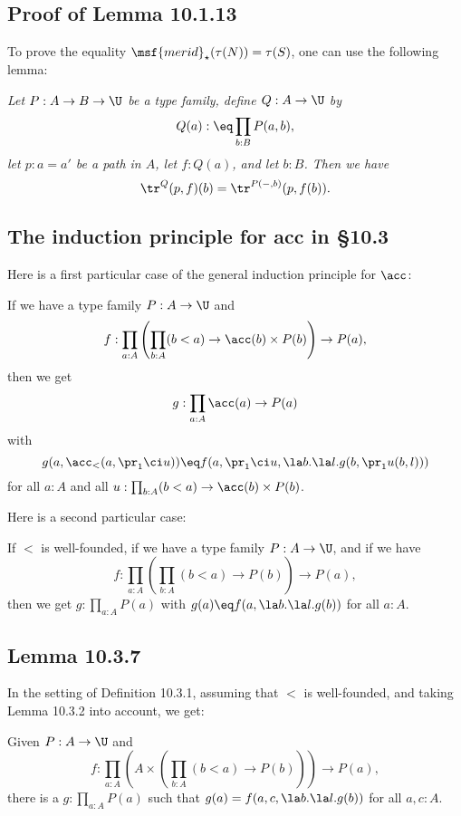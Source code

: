\documentclass[12pt]{article}
\begin{document}

\subsection{Proof of Lemma 10.1.13}

To prove the equality $\msf{merid}_\star(\tau(N))=\tau(S)$, one can use the following lemma:

\emph{Let $P:A\to B\to\U$ be a type family, define $Q:A\to\U$ by $$Q(a):\eq\prod_{b:B}P(a,b),$$ let $p:a=a'$ be a path in $A$, let $f:Q(a)$, and let $b:B$. Then we have} 
$$
\tr^Q(p,f)(b)=\tr^{P(-,b)}(p,f(b)).
$$


\subsection{The induction principle for \textsf{acc} in \S10.3}

Here is a first particular case of the general induction principle for $\acc$:

If we have a type family $P:A\to\U$ and %
$$
f:\prod_{a:A}\left(\prod_{b:A}(b<a)\to\acc(b)\times P(b)\right)\to P(a),%
$$ 
then we get 
$$
g:\prod_{a:A}\acc(a)\to P(a)
$$
with
$$
g(a,\acc_<(a,\pr_1\ci u))\eq f(a,\pr_1\ci u,\la b.\la l.g(b,\pr_1 u(b,l)))
$$
for all $a:A$ and all $u:\prod_{b:A}(b<a)\to\acc(b)\times P(b)$. 

Here is a second particular case:

If $<$ is well-founded, if we have a type family $P:A\to\U$, and if we have 
$$
f:\prod_{a:A}\left(\prod_{b:A}(b<a)\to P(b)\right)\to P(a),
$$
then we get $g:\prod_{a:A}P(a)$ with $g(a)\eq f(a,\la b.\la l.g(b))$ for all $a:A$.


\subsection{Lemma 10.3.7}\label{s1037}

In the setting of Definition 10.3.1, assuming that $<$ is well-founded, and taking Lemma 10.3.2 into account, we get:

Given $P:A\to\U$ and
$$%
f:\prod_{a:A}\left(A\times\left(\prod_{b:A}(b<a)\to P(b)\right)\right)\to P(a),
$$%
there is a $g:\prod_{a:A}P(a)$ such that $g(a)=f(a,c,\la b.\la l.g(b))$ for all $a,c:A$.
\end{document}
